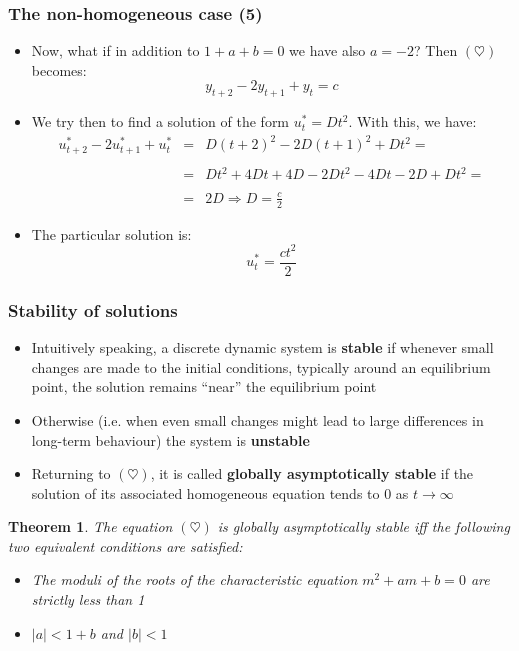 \documentclass[10pt,usenames,dvipsnames]{beamer}
\theoremstyle{plain}
\newtheorem{thm}{Theorem}
\theoremstyle{definition}
\begin{document}
\begin{frame}[fragile]
\frametitle{The non-homogeneous case (5)}
\begin{itemize}
	\item Now, what if in addition to $1 + a + b = 0$ we have also $a = -2$? Then $(\heartsuit)$ becomes:
	\[
		y_{t+2} - 2y_{t+1} + y_{t} = c
	\]
	\item We try then to find a solution of the form $u_{t}^{*} = Dt^{2}$. With this, we have:
	\[
	\begin{array}{lcl}
		u_{t+2}^{*} - 2 u_{t+1}^{*} + u_{t}^{*} & = & D(t+2)^{2} - 2 D(t+1)^{2} + Dt^{2} = \\
		\quad\\
		& = & Dt^{2} + 4Dt + 4D - 2Dt^{2} - 4Dt - 2D + Dt^{2} = \\
		\quad\\
		& = & \displaystyle 2D \Rightarrow D = \frac{c}{2}
	\end{array}
	\]
	\item The particular solution is:
	\[
		u_{t}^{*} = \frac{c t^{2}}{2}
	\]
\end{itemize}
\end{frame}

\begin{frame}[fragile]
\frametitle{Stability of solutions}
\begin{itemize}
	\item Intuitively speaking, a discrete dynamic system is \textbf{stable} if whenever small changes are made to the initial conditions, typically around an equilibrium point, the solution remains ``near'' the equilibrium point
	\item Otherwise (i.e. when even small changes might lead to large differences in long-term behaviour) the system is \textbf{unstable}
	\item Returning to $(\heartsuit)$, it is called \textbf{globally asymptotically stable} if the solution of its associated homogeneous equation tends to 0 as $t \to \infty$
\end{itemize}

\begin{thm}
	The equation $(\heartsuit)$ is globally asymptotically stable iff the following two equivalent conditions are satisfied:
	\begin{itemize}
		\item[(A)] The moduli of the roots of the characteristic equation $m^{2} + am + b = 0$ are strictly less than 1
		\item[(B)] $|a| < 1 + b$ and $|b| < 1$
	\end{itemize}
\end{thm}
\end{frame}
\end{document}
